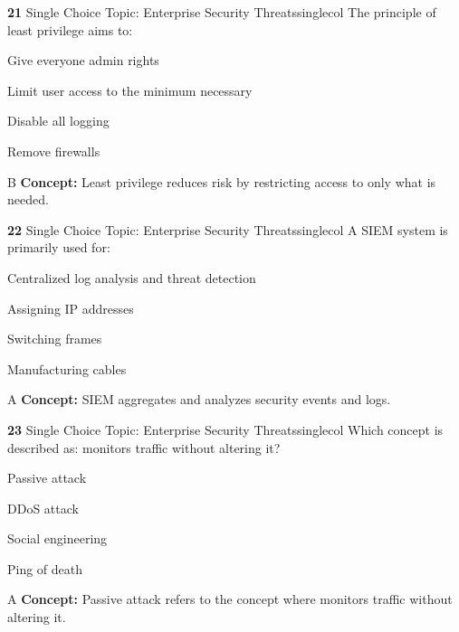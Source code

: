 \documentclass[10pt,a4paper]{article}
\begin{document}
\begin{qcard}{\color{white}\textbf{21} \hfill \small Single Choice \textbar{} Topic: Enterprise Security Threats}{singlecol}
The principle of least privilege aims to:

\begin{qoptions}
\item Give everyone admin rights
\item Limit user access to the minimum necessary
\item Disable all logging
\item Remove firewalls
\end{qoptions}
\begin{explainbox}{B}
\textbf{Concept:} Least privilege reduces risk by restricting access to only what is needed.
\end{explainbox}
\end{qcard}

\begin{qcard}{\color{white}\textbf{22} \hfill \small Single Choice \textbar{} Topic: Enterprise Security Threats}{singlecol}
A SIEM system is primarily used for:

\begin{qoptions}
\item Centralized log analysis and threat detection
\item Assigning IP addresses
\item Switching frames
\item Manufacturing cables
\end{qoptions}
\begin{explainbox}{A}
\textbf{Concept:} SIEM aggregates and analyzes security events and logs.
\end{explainbox}
\end{qcard}

\begin{qcard}{\color{white}\textbf{23} \hfill \small Single Choice \textbar{} Topic: Enterprise Security Threats}{singlecol}
Which concept is described as: monitors traffic without altering it?

\begin{qoptions}
\item Passive attack
\item DDoS attack
\item Social engineering
\item Ping of death
\end{qoptions}
\begin{explainbox}{A}
\textbf{Concept:} Passive attack refers to the concept where monitors traffic without altering it.
\end{explainbox}
\end{qcard}
\end{document}
